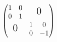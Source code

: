 \documentclass[nofonts]{ctexart}
\begin{document}
\[
	\begin{pmatrix}
		\begin{matrix}
			1 & 0 				\\
			0 & 1 				\\
		\end{matrix}
		& \text{\Large{0}}			\\
		\text{\Large{0}} &
		\begin{matrix}
			1 & 0				\\
			0 & -1
		\end{matrix}
	\end{pmatrix}
\]
\end{document}
